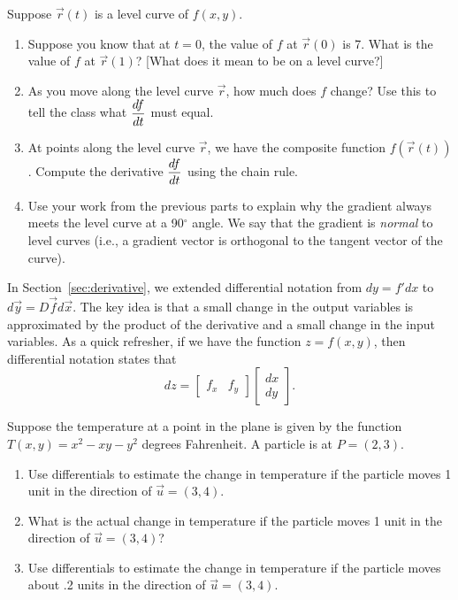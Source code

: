 \begin{problem}
 Suppose $\vec r(t)$ is a level curve of $f(x,y)$.  
\begin{enumerate}
 \item Suppose you know that at $t=0$, the value of $f$ at $\vec r(0)$ is 7.  What is the value of $f$ at $\vec r(1)$? [What does it mean to be on a level curve?]
 \item As you move along the level curve $\vec r$, how much does $f$ change?  Use this to tell the class what $\displaystyle\frac{df}{dt}$ must equal.
 \item At points along the level curve $\vec r$, we have the composite function $f(\vec r(t))$.  Compute the derivative $\displaystyle\frac{df}{dt}$ using the chain rule.
 \item Use your work from the previous parts to explain why the gradient always meets the level curve at a 90$^\circ$ angle.  We say that the gradient is \emph{normal} to level curves (i.e., a gradient vector is orthogonal to the tangent vector of the curve).
\end{enumerate}
\end{problem}

In Section~\ref{sec:derivative}, we extended differential notation from $dy=f' dx$ to $d\vec y = D\vec f d\vec x$. The key idea is that a small change in the output variables is approximated by the product of the derivative and a small change in the input variables. As a quick refresher, if  we have the function $z=f(x,y)$, then differential notation states that $$dz = \begin{bmatrix}f_x&f_y\end{bmatrix} \begin{bmatrix}dx\\dy\end{bmatrix}.$$ 

\begin{problem}
Suppose the temperature at a point in the plane is given by the function {$T(x,y)=x^2-xy-y^2$} degrees Fahrenheit. A particle is at $P=(2,3)$.  
\begin{enumerate}
 \item Use differentials to estimate the change in temperature if the particle moves 1 unit in the direction of $\vec u=\left(3,4\right)$.
 \item What is the actual change in temperature if the particle moves 1 unit in the direction of $\vec u=\left(3,4\right)$?
 \item Use differentials to estimate the change in temperature if the particle moves about .2 units in the direction of $\vec u=\left(3,4\right)$.
\end{enumerate}
\end{problem}

